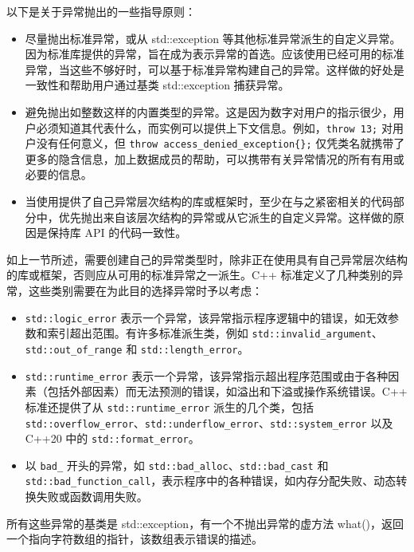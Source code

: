 以下是关于异常抛出的一些指导原则：

\begin{itemize}
\item
尽量抛出标准异常，或从 std::exception 等其他标准异常派生的自定义异常。因为标准库提供的异常，旨在成为表示异常的首选。应该使用已经可用的标准异常，当这些不够好时，可以基于标准异常构建自己的异常。这样做的好处是一致性和帮助用户通过基类 std::exception 捕获异常。

\item
避免抛出如整数这样的内置类型的异常。这是因为数字对用户的指示很少，用户必须知道其代表什么，而实例可以提供上下文信息。例如，\verb|throw 13;| 对用户没有任何意义，但 \verb|throw access_denied_exception{};| 仅凭类名就携带了更多的隐含信息，加上数据成员的帮助，可以携带有关异常情况的所有有用或必要的信息。

\item
当使用提供了自己异常层次结构的库或框架时，至少在与之紧密相关的代码部分中，优先抛出来自该层次结构的异常或从它派生的自定义异常。这样做的原因是保持库 API 的代码一致性。
\end{itemize}


如上一节所述，需要创建自己的异常类型时，除非正在使用具有自己异常层次结构的库或框架，否则应从可用的标准异常之一派生。C++ 标准定义了几种类别的异常，这些类别需要在为此目的选择异常时予以考虑：

\begin{itemize}
\item
\verb|std::logic_error| 表示一个异常，该异常指示程序逻辑中的错误，如无效参数和索引超出范围。有许多标准派生类，例如 \verb|std::invalid_argument|、\verb|std::out_of_range| 和 \verb|std::length_error|。

\item
\verb|std::runtime_error| 表示一个异常，该异常指示超出程序范围或由于各种因素（包括外部因素）而无法预测的错误，如溢出和下溢或操作系统错误。C++ 标准还提供了从 \verb|std::runtime_error| 派生的几个类，包括 \verb|std::overflow_error|、\verb|std::underflow_error|、\verb|std::system_error| 以及 C++20 中的 \verb|std::format_error|。

\item
以 \verb|bad_| 开头的异常，如 \verb|std::bad_alloc|、\verb|std::bad_cast| 和 \verb|std::bad_function_call|，表示程序中的各种错误，如内存分配失败、动态转换失败或函数调用失败。
\end{itemize}

所有这些异常的基类是 std::exception，有一个不抛出异常的虚方法 what()，返回一个指向字符数组的指针，该数组表示错误的描述。

